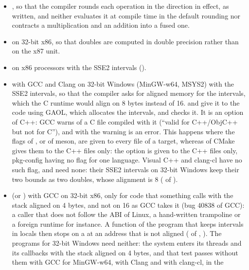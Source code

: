 \documentclass[12pt,a4paper,twoside,openright]{book}
\begin{document}
\begin{itemize}
\item {}, so that the
  compiler rounds each operation in the direction in effect, as written, and
  neither evaluates it at compile time in the default rounding nor contracts a
  multiplication and an addition into a fused one.
\item {} on 32-bit x86, so that doubles are computed
  in double precision rather than on the x87 unit.
\item {} on x86 processors with the SSE2 intervals
  ().
\item {} with GCC and Clang on 32-bit Windows
  (MinGW-w64, MSYS2) with the SSE2 intervals, so that the compiler asks for
  aligned memory for the intervals, which the C runtime would align on 8 bytes
  instead of 16.\newinvfive{}  and  give it to
  the code using GAOL, which allocates the intervals, and
   checks it. It is an option of C++: GCC warns of a
  C file compiled with it (``valid for C++/ObjC++ but not for C''), and with
   the warning is an error. This happens where the flags of
  , or  of meson, are given to every file of a
  target, whereas  of CMake gives them to the C++ files only:
  the option is given to the C++ files only, pkg-config having no flag for one
  language. Visual C++ and clang-cl have no such flag, and need none: their
  SSE2 intervals on 32-bit Windows keep their two bounds as two doubles, whose
  alignment is 8 ( of
  ).
\item {} (or ) with
  GCC on 32-bit x86, only for code that something calls with the stack aligned
  on 4 bytes, and not on 16 as GCC takes it (bug 40838 of GCC): a caller that
  does not follow the ABI of Linux, a hand-written trampoline or a foreign
  runtime for instance. A function of the program that keeps intervals in
  locals then stops on a  at an address that is not aligned
  ( of
  , ).\newinvfive{} The
  programs for 32-bit Windows need neither: the system enters its threads and
  its callbacks with the stack aligned on 4 bytes, and that test passes
  without them with GCC for MinGW-w64, with Clang and with clang-cl, in the

\end{itemize}
\end{document}
